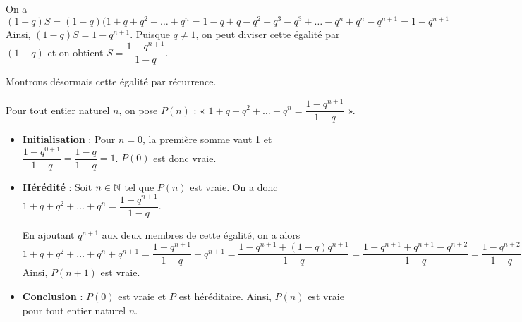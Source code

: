 \documentclass[11pt,fleqn]{book} %
\begin{document}
\begin{solution}On a 
\[(1-q)S=(1-q)(1+q+q^2+\ldots + q^n = 1-q+q-q^2+q^3-q^3+\ldots -q^n+q^n-q^{n+1}=1-q^{n+1}\]
Ainsi, $(1-q)S=1-q^{n+1}$. Puisque $q\neq 1$, on peut diviser cette égalité par $(1-q)$ et on obtient $S=\dfrac{1-q^{n+1}}{1-q}$.

Montrons désormais cette égalité par récurrence. 

Pour tout entier naturel $n$, on pose $P(n)$ : « $1+q+q^2+\ldots + q^n = \dfrac{1-q^{n+1}}{1-q}$ ».
\begin{itemize}
\item \textbf{Initialisation} : Pour $n=0$, la première somme vaut 1 et $\dfrac{1-q^{0+1}}{1-q}=\dfrac{1-q}{1-q}=1$. $P(0)$ est donc vraie.
\item \textbf{Hérédité} : Soit $n\in\mathbb{N}$ tel que $P(n)$ est vraie. On a donc $1+q+q^2+\ldots + q^n = \dfrac{1-q^{n+1}}{1-q}$.

En ajoutant $q^{n+1}$ aux deux membres de cette égalité, on a alors
\[1+q+q^2+\ldots + q^n+q^{n+1} = \dfrac{1-q^{n+1}}{1-q}+q^{n+1}=\dfrac{1-q^{n+1}+(1-q)q^{n+1}}{1-q}=\dfrac{1-q^{n+1}+q^{n+1}-q^{n+2}}{1-q}=\dfrac{1-q^{n+2}}{1-q}\]
Ainsi, $P(n+1)$ est vraie.
\item \textbf{Conclusion} : $P(0)$ est vraie et $P$ est héréditaire. Ainsi, $P(n)$ est vraie pour tout entier naturel $n$.
\end{itemize}\end{solution}
\end{document}
